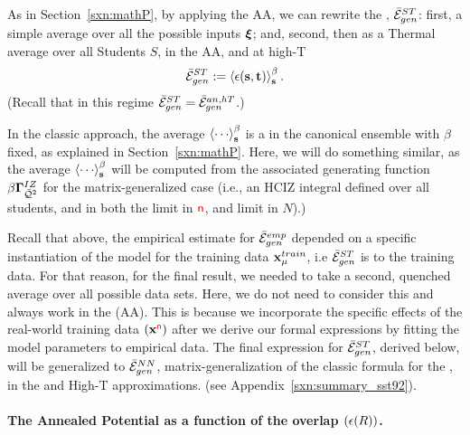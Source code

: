 As in Section~\ref{sxn:mathP}, by applying the AA, we can rewrite the \AverageSTGeneralizationError, $\bar{\mathcal{E}}^{ST}_{gen}$:
first, a simple average over all the possible inputs $\boldsymbol{\xi}$; and, 
second, then as a Thermal average over all Students $S$, in the AA, and at high-T 
\begin{align}
\label{eqn:MGE}
\bar{\mathcal{E}}^{ST}_{gen}:=\left\langle \epsilon({\mathbf{s}}, {\mathbf{t}} ) \right\rangle_{\mathbf s}^{\beta} .
\end{align}
(Recall that in this regime $\bar{\mathcal{E}}^{ST}_{gen}=\bar{\mathcal{E}}_{gen}^{an,hT}$.)

In the classic \STATMECH approach, the average $\THRMAVG{\cdots}$ is
a \ThermalAverage in the canonical ensemble with $\beta$ fixed,
as explained in Section~\ref{sxn:mathP}.  Here, we will do something similar, as the \Student
average $\THRMAVG{\cdots}$ will be computed from the associated
generating function $\beta\mathbf{\Gamma}^{IZ}_{\bar{\mathcal{Q}}^{2}}$ for the matrix-generalized case  (i.e., an HCIZ integral defined over all students,
and in both the \LargeN \Thermodynamic limit in ${\color{red}\sf{n}}$, and \WideLayer \LargeN  limit in $N$).)

Recall that above, the empirical estimate for $\bar{\mathcal{E}}^{emp}_{gen}$ depended on a
specific instantiation of the model for the training data $\mathbf{x}_{\mu}^{train}$,
i.e  $\bar{\mathcal{E}}^{ST}_{gen}$ is \Quenched to the training data.
For that reason, for the final result, we needed to take a second,
quenched average over all possible data sets.
Here, we do not need to consider this and always work in the \AnnealedApproximation(AA).
This is because we incorporate
the specific effects of the real-world training data $(\mathbf{x}^{{\color{red}\sf{n}}})$ after we derive our formal expressions
by fitting the model parameters to empirical data.
The final expression for $\bar{\mathcal{E}}^{ST}_{gen}$, derived below,
will be generalized to $\bar{\mathcal{E}}^{NN}_{gen}$, matrix-generalization of  the classic \STATMECH formula
for the \LinearPerceptron, in the \Annealed and High-T approximations.
(see Appendix~\ref{sxn:summary_sst92}). 

\paragraph{The Annealed Potential as a function of the overlap $(\epsilon(R))$.}

